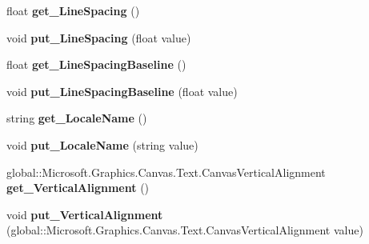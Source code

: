 \begin{DoxyCompactItemize}
float {\bfseries get\+\_\+\+Line\+Spacing} ()
\item 
\mbox{\label{interface_microsoft_1_1_graphics_1_1_canvas_1_1_text_1_1_i_canvas_text_format_ac401fd4d64b77e565a9f396c5d01bbbf}} 
void {\bfseries put\+\_\+\+Line\+Spacing} (float value)
\item 
\mbox{\label{interface_microsoft_1_1_graphics_1_1_canvas_1_1_text_1_1_i_canvas_text_format_a9631de3b42e61a4b1a129d768633e3cb}} 
float {\bfseries get\+\_\+\+Line\+Spacing\+Baseline} ()
\item 
\mbox{\label{interface_microsoft_1_1_graphics_1_1_canvas_1_1_text_1_1_i_canvas_text_format_a4e8b8bf13da719b299b6a5676dd92c96}} 
void {\bfseries put\+\_\+\+Line\+Spacing\+Baseline} (float value)
\item 
\mbox{\label{interface_microsoft_1_1_graphics_1_1_canvas_1_1_text_1_1_i_canvas_text_format_a9fbcf60a43f2e17aeac3b52f0ae5e4a2}} 
string {\bfseries get\+\_\+\+Locale\+Name} ()
\item 
\mbox{\label{interface_microsoft_1_1_graphics_1_1_canvas_1_1_text_1_1_i_canvas_text_format_ab29c7707ce1512d0532907fed423fe67}} 
void {\bfseries put\+\_\+\+Locale\+Name} (string value)
\item 
\mbox{\label{interface_microsoft_1_1_graphics_1_1_canvas_1_1_text_1_1_i_canvas_text_format_a46bed4e8bb37c20382588d22721561df}} 
global\+::\+Microsoft.\+Graphics.\+Canvas.\+Text.\+Canvas\+Vertical\+Alignment {\bfseries get\+\_\+\+Vertical\+Alignment} ()
\item 
\mbox{\label{interface_microsoft_1_1_graphics_1_1_canvas_1_1_text_1_1_i_canvas_text_format_a47eeac343ee56e937ea663d034a43e3f}} 
void {\bfseries put\+\_\+\+Vertical\+Alignment} (global\+::\+Microsoft.\+Graphics.\+Canvas.\+Text.\+Canvas\+Vertical\+Alignment value)

\end{DoxyCompactItemize}
